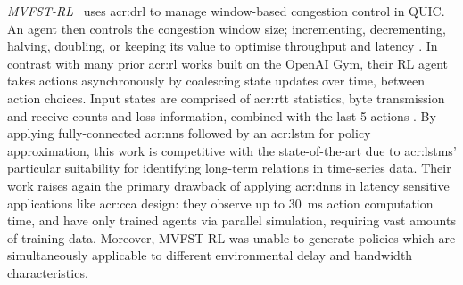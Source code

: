 \emph{MVFST-RL}~\parencite{DBLP:journals/corr/abs-1910-04054} uses \gls{acr:drl} to manage window-based congestion control in QUIC.
An agent then controls the congestion window size; incrementing, decrementing, halving, doubling, or keeping its value \prllitact{} to optimise throughput and latency \prllitreward.
In contrast with many prior \gls{acr:rl} works built on the OpenAI Gym, their RL agent takes actions asynchronously by coalescing state updates over time, between action choices.
Input states are comprised of \gls{acr:rtt} statistics, byte transmission and receive counts and loss information, combined with the last \num{5} actions \prllitstate.
By applying fully-connected \glspl{acr:nn} followed by an \gls{acr:lstm} for policy approximation, this work is competitive with the state-of-the-art due to \glspl{acr:lstm}' particular suitability for identifying long-term relations in time-series data.
Their work raises again the primary drawback of applying \glspl{acr:dnn} in latency sensitive applications like \gls{acr:cca} design: they observe up to \qty{30}{\milli\second} action computation time, and have only trained agents via parallel simulation, requiring vast amounts of training data.
Moreover, MVFST-RL was unable to generate policies which are simultaneously applicable to different environmental delay and bandwidth characteristics.

